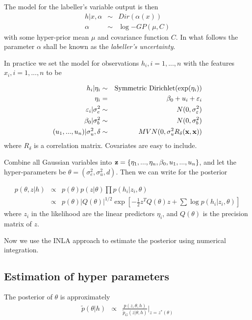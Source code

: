\documentclass[10pt, onecolumn]{article}
\newcommand{\x}{z}
\newcommand{\y}{h}
\begin{document}
The model for the labeller's variable output is then
\begin{eqnarray}
h | x, \alpha &\sim& Dir(\alpha(x))\\
\alpha &\sim & \log{-GP(\mu, C)}
\end{eqnarray}
with some hyper-prior mean $\mu$ and covariance function $C$. In what
follows the parameter $\alpha$ shall be known as the \emph{labeller's
  uncertainty}. 


In practice we set the model for observations $h_i, i=1,...,n$ with the features  $x_i, i=1, ..., n$ to be

\begin{eqnarray}
h_i | \eta_i & \sim & \mathrm{Symmetric\ Dirichlet}(\exp(\eta_i))\\
\eta_i &=& \beta_0 + u_i + \varepsilon_i \\
\varepsilon_i|\sigma_e^2  &\sim & N(0, \sigma^2_\varepsilon)\\
\beta_0|\sigma_b^2 &\sim & N(0, \sigma^2_b)\\
(u_1,...,u_n)|\sigma_u^2, \delta  &\sim & MVN(0, \sigma_u^2 R_{\delta}(\bold x, \bold x))
\end{eqnarray}
where $R_\delta$ is a correlation matrix. Covariates are easy to include.


Combine all Gaussian variables into $\bold \x=\{\eta_1,...,\eta_n, \beta_0, u_1, ..., u_n\}$, and let the hyper-parameters be $\theta=(\sigma_e^2, \sigma_u^2, d)$. Then we can write for the posterior

\begin{eqnarray}
p(\theta, \x | \y ) &\propto& p(\theta)p(\x|\theta) \prod p(h_i|\x_i, \theta)\\
&\propto&p(\theta)|Q(\theta)|^{1/2} \exp\left[-\frac{1}{2}\x^T Q(\theta)\x + \sum \log p(\y_i|\x_i,\theta)\right]
\end{eqnarray}
where $\x_i$ in the likelihood are the linear predictors $\eta_i$, and $Q(\theta)$ is the precision matrix of $\x$. 

Now we use the INLA approach to estimate the posterior using numerical integration. 
\subsection{Estimation of hyper parameters}
The posterior of $\theta$ is approximately
\begin{eqnarray}
\tilde p(\theta|\y) &\propto & \frac{p(\x, \theta, \y)}{\tilde p_G(\x|\theta, \y)} \Big|_{\x=\x^*(\theta)}
\end{eqnarray}
 
\end{document}
